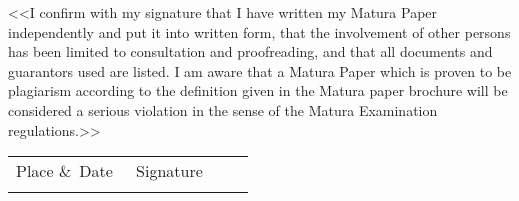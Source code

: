 <<I confirm with my signature that I have written my Matura Paper independently and put it into written form, that the involvement of other persons has been limited to consultation and proofreading, and that all documents and guarantors used are listed. I am aware that a Matura Paper which is proven to be plagiarism according to the definition given in the Matura paper brochure will be considered a serious violation in the sense of the Matura Examination regulations.>>
\vspace{3cm}

\noindent
\begin{tabular}{p{0.47\linewidth}p{0.47\linewidth}}
  Place \&\ Date & Signature \\
  & \\[1cm]
  \hline
\end{tabular}
